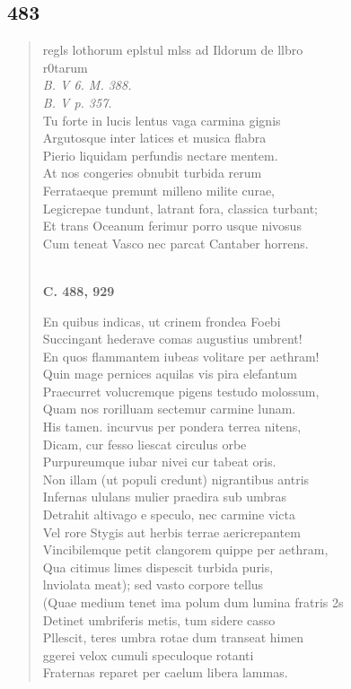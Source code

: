 \documentclass[11pt, a4paper]{report}
\begin{document}
            \subsection*{483}
      \begin{verse}
      regls lothorum eplstul mlss ad Ildorum de llbro \\ r0tarum \\ \textit{B. V 6. M. 388.} \\ \textit{B. V p. 357.} \\ Tu forte in lucis lentus vaga carmina gignis \\ Argutosque inter latices et musica flabra \\ Pierio liquidam perfundis nectare mentem. \\ At nos congeries obnubit turbida rerum \\ Ferrataeque premunt milleno milite curae, \\ Legicrepae tundunt, latrant fora, classica turbant; \\ Et trans Oceanum ferimur porro usque nivosus \\ Cum teneat Vasco nec parcat Cantaber horrens. \\ 
        ﻿\pagebreak 
    \begin{center} \textbf{C. 488, 929} \end{center}En quibus indicas, ut crinem frondea Foebi \\ Succingant hederave comas augustius umbrent! \\ En quos flammantem iubeas volitare per aethram! \\ Quin mage pernices aquilas vis pira elefantum \\ Praecurret volucremque pigens testudo molossum, \\ Quam nos rorilluam sectemur carmine lunam. \\ His tamen. incurvus per pondera terrea nitens, \\ Dicam, cur fesso liescat circulus orbe \\ Purpureumque iubar nivei cur tabeat oris. \\ Non illam (ut populi credunt) nigrantibus antris \\ Infernas ululans mulier praedira sub umbras \\ Detrahit altivago e speculo, nec carmine victa \\ Vel rore Stygis aut herbis terrae aericrepantem \\ Vincibilemque petit clangorem quippe per aethram, \\ Qua citimus limes dispescit turbida puris, \\ lnviolata meat); sed vasto corpore tellus \\ (Quae medium tenet ima polum dum lumina fratris 2s \\ Detinet umbriferis metis, tum sidere casso \\ Pllescit, teres umbra rotae dum transeat himen \\ ggerei velox cumuli speculoque rotanti \\ Fraternas reparet per caelum libera lammas. \\ 

\end{verse}
\end{document}
